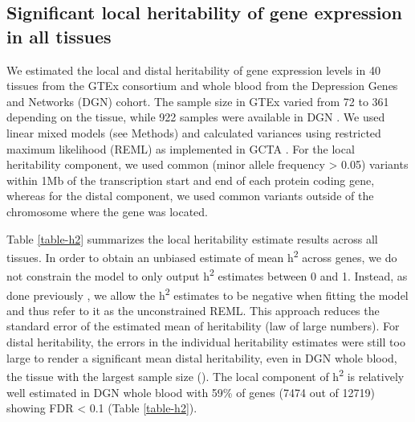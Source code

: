 \documentclass[10pt,letterpaper]{article}
\begin{document}
\subsection*{Significant local heritability of gene expression in all tissues}\label{local-genetic-variation-can-be-well-characterized-for-all-tissues}

We estimated the local and distal heritability of gene expression levels in 40 tissues from the GTEx consortium and whole blood from the Depression Genes and Networks (DGN) cohort. The sample size in GTEx varied from 72 to 361 depending on the tissue, while 922 samples were available in DGN \cite{Battle_2013}. We used linear mixed models (see Methods) and calculated variances using restricted maximum likelihood (REML) as implemented in GCTA \cite{Yang_2011}. For the local heritability component, we used common (minor allele frequency \textgreater{} 0.05) variants within 1Mb of the transcription start and end of each protein coding gene, whereas for the distal component, we used common variants outside of the chromosome where the gene was located.

Table \ref{table-h2} summarizes the local heritability estimate results across all tissues. In order to obtain an unbiased estimate of mean h\textsuperscript{2} across genes, we do not constrain the model to only output h\textsuperscript{2} estimates between 0 and 1. Instead, as done previously \cite{Price_2011,Wright_2014}, we allow the h\textsuperscript{2} estimates to be negative when fitting the model and thus refer to it as the unconstrained REML. This approach reduces the standard error of the estimated mean of heritability (law of large numbers). 
For distal heritability, the errors in the individual heritability estimates were still too large to render a significant mean distal heritability, even in DGN whole blood, the tissue with the largest sample size (). The local component of h\textsuperscript{2} is relatively well estimated in DGN whole blood with 59\% of genes  (7474 out of 12719) showing FDR \textless{} 0.1 (Table \ref{table-h2}).
\end{document}
